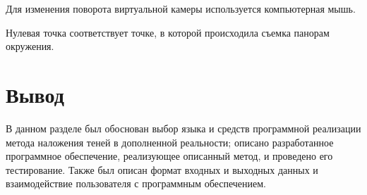 Для изменения поворота виртуальной камеры используется компьютерная мышь.

Нулевая точка соответствует точке, в которой происходила съемка панорам окружения.

\section*{Вывод}

В данном разделе был обоснован выбор языка и средств программной реализации метода наложения теней в дополненной реальности; описано разработанное программное обеспечение, реализующее описанный метод, и проведено его тестирование. Также был описан формат входных и выходных данных и взаимодействие пользователя с программным обеспечением.